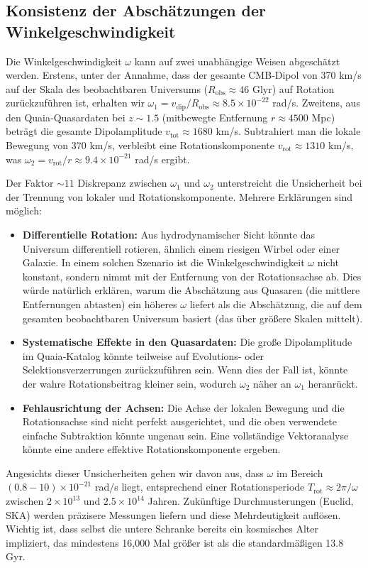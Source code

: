\documentclass[11pt,a4paper]{article}
\begin{document}
	\subsection{Konsistenz der Abschätzungen der Winkelgeschwindigkeit}
	
	Die Winkelgeschwindigkeit \(\omega\) kann auf zwei unabhängige Weisen abgeschätzt werden. Erstens, unter der Annahme, dass der gesamte CMB‑Dipol von 370 km/s auf der Skala des beobachtbaren Universums (\(R_{\text{obs}} \approx 46\) Glyr) auf Rotation zurückzuführen ist, erhalten wir \(\omega_1 = v_{\text{dip}}/R_{\text{obs}} \approx 8.5\times10^{-22}\) rad/s. Zweitens, aus den Quaia‑Quasardaten bei \(z\sim1.5\) (mitbewegte Entfernung \(r \approx 4500\) Mpc) beträgt die gesamte Dipolamplitude \(v_{\text{tot}} \approx 1680\) km/s. Subtrahiert man die lokale Bewegung von 370 km/s, verbleibt eine Rotationskomponente \(v_{\text{rot}} \approx 1310\) km/s, was \(\omega_2 = v_{\text{rot}}/r \approx 9.4\times10^{-21}\) rad/s ergibt.
	
	Der Faktor \(\sim11\) Diskrepanz zwischen \(\omega_1\) und \(\omega_2\) unterstreicht die Unsicherheit bei der Trennung von lokaler und Rotationskomponente. Mehrere Erklärungen sind möglich:
	\begin{itemize}
		\item \textbf{Differentielle Rotation:} Aus hydrodynamischer Sicht könnte das Universum differentiell rotieren, ähnlich einem riesigen Wirbel oder einer Galaxie. In einem solchen Szenario ist die Winkelgeschwindigkeit \(\omega\) nicht konstant, sondern nimmt mit der Entfernung von der Rotationsachse ab. Dies würde natürlich erklären, warum die Abschätzung aus Quasaren (die mittlere Entfernungen abtasten) ein höheres \(\omega\) liefert als die Abschätzung, die auf dem gesamten beobachtbaren Universum basiert (das über größere Skalen mittelt).
		\item \textbf{Systematische Effekte in den Quasardaten:} Die große Dipolamplitude im Quaia‑Katalog könnte teilweise auf Evolutions- oder Selektionsverzerrungen zurückzuführen sein. Wenn dies der Fall ist, könnte der wahre Rotationsbeitrag kleiner sein, wodurch \(\omega_2\) näher an \(\omega_1\) heranrückt.
		\item \textbf{Fehlausrichtung der Achsen:} Die Achse der lokalen Bewegung und die Rotationsachse sind nicht perfekt ausgerichtet, und die oben verwendete einfache Subtraktion könnte ungenau sein. Eine vollständige Vektoranalyse könnte eine andere effektive Rotationskomponente ergeben.
	\end{itemize}
	Angesichts dieser Unsicherheiten gehen wir davon aus, dass \(\omega\) im Bereich \((0.8-10)\times10^{-21}\) rad/s liegt, entsprechend einer Rotationsperiode \(T_{\text{rot}} \approx 2\pi/\omega\) zwischen \(2\times10^{13}\) und \(2.5\times10^{14}\) Jahren. Zukünftige Durchmusterungen (Euclid, SKA) werden präzisere Messungen liefern und diese Mehrdeutigkeit auflösen. Wichtig ist, dass selbst die untere Schranke bereits ein kosmisches Alter impliziert, das mindestens 16,000 Mal größer ist als die standardmäßigen 13.8 Gyr.
	
\end{document}
